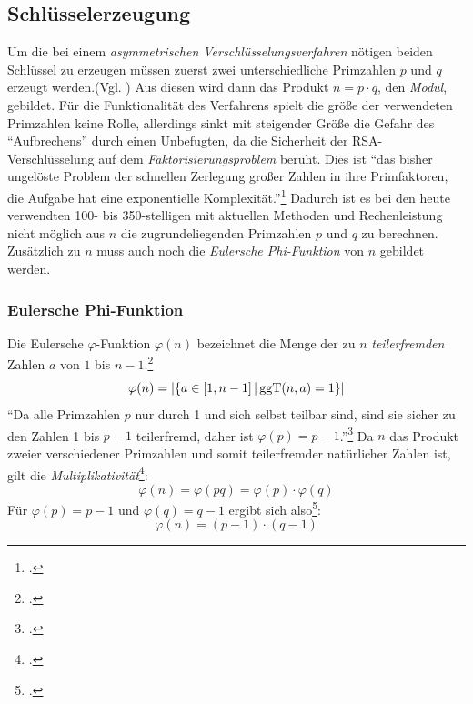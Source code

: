 \documentclass{scrarticle} %
\begin{document}
    \subsection{Schlüsselerzeugung}
        Um die bei einem \emph{asymmetrischen Verschlüsselungsverfahren} nötigen beiden Schlüssel zu erzeugen müssen zuerst zwei unterschiedliche Primzahlen $p$ und $q$ erzeugt werden.(Vgl. \cite[278]{dankmeier2006}) Aus diesen wird dann das Produkt $n=p\cdot q$, den \emph{Modul}, gebildet. Für die Funktionalität des Verfahrens spielt die größe der verwendeten Primzahlen keine Rolle, allerdings sinkt mit steigender Größe die Gefahr des \enquote{Aufbrechens} durch einen Unbefugten, da die Sicherheit der RSA-Verschlüsselung auf dem \emph{Faktorisierungsproblem} beruht. Dies ist \enquote{das bisher ungelöste Problem der schnellen Zerlegung großer Zahlen in ihre Primfaktoren, die Aufgabe hat eine exponentielle Komplexität.}\footcite[279]{dankmeier2006} Dadurch ist es bei den heute verwendten 100- bis 350-stelligen mit aktuellen Methoden und Rechenleistung nicht möglich aus $n$ die zugrundeliegenden Primzahlen $p$ und $q$ zu berechnen. %
        Zusätzlich zu $n$ muss auch noch die \emph{Eulersche Phi-Funktion} von $n$ gebildet werden.
        \subsubsection{Eulersche Phi-Funktion}
            Die Eulersche $\varphi$-Funktion $\varphi(n)$ bezeichnet die Menge der zu $n$ \emph{teilerfremden} Zahlen $a$ von $1$ bis $n-1$.\footcite[Vgl.][111]{swoboda2008kryptographie}
            \begin{equation}
                \varphi(n)= |\{a\in \left[ 1, n-1 \right] | \operatorname{ggT}(n, a)=1\}|
            \end{equation}
            \enquote{Da alle Primzahlen $p$ nur durch 1 und sich selbst teilbar sind, sind sie sicher zu den Zahlen 1 bis $p-1$ teilerfremd, daher ist $\varphi(p) = p-1$.}\footcite{steinfeld}
            Da $n$ das Produkt zweier verschiedener Primzahlen und somit teilerfremder natürlicher Zahlen ist, gilt die \emph{Multiplikativität}\footcite[Vgl.][]{steinfeld}:
            \begin{equation}
                \varphi(n) = \varphi(pq) = \varphi(p)\cdot\varphi(q)
            \end{equation}
            Für $\varphi(p) = p-1$ und $\varphi(q) = q-1$ ergibt sich also\footcite[Vgl.][279]{dankmeier2006}:
            \begin{equation}
                \varphi(n) = (p-1)\cdot(q-1)
            \end{equation}
\end{document}
